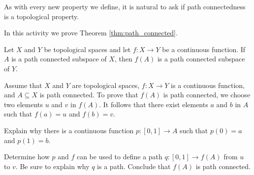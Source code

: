 
As with every new property we define, it is natural to ask if path connectedness is a topological property.

\begin{activity} In this activity we prove Theorem \ref{thm:path_connected}.

\begin{theorem} \label{thm:path_connected} Let $X$ and $Y$ be topological spaces and let $f : X \to Y$ be a continuous function. If $A$ is a path connected subspace of $X$, then $f(A)$ is a path connected subspace of $Y$. 
\end{theorem}

Assume that $X$ and $Y$ are topological spaces, $f : X \to Y$ is a continuous function, and $A \subseteq X$ is path connected. To prove that $f(A)$ is path connected, we choose two elements $u$ and $v$ in $f(A)$. It follows that there exist elements $a$ and $b$ in $A$ such that $f(a) = u$ and $f(b) = v$. 

\ba

\item Explain why there is a continuous function $p: [0,1] \to A$ such that $p(0) = a$ and $p(1) = b$. 

\item Determine how $p$ and $f$ can be used to define a path $q: [0,1] \to f(A)$ from $u$ to $v$. Be sure to explain why $q$ is a  path. Conclude that $f(A)$ is path connected. 

\ea

\end{activity}

\begin{comment}

\ActivitySolution

\ba

\item Since $A$ is path connected, there is a path $p$ in $A$ from $a$ to $b$. That is, $p: [0,1] \to A$ is a continuous function such that $p(0) = a$ and $p(1) = b$. 

\item Let $q : [0,1] \to f(A)$ be defined by $q= f \circ p$. As a composite of continuous functions we know that $q$ is a continuous function. Also, $q(0) = (fp)(0) = f(a) = u$ and $q(1) = (fp)(1) = f(b) = v$. Thus, $q$ is a path in $f(A)$ from $u$ to $v$ and $f(A)$ is path connected.

\ea

\end{comment}


